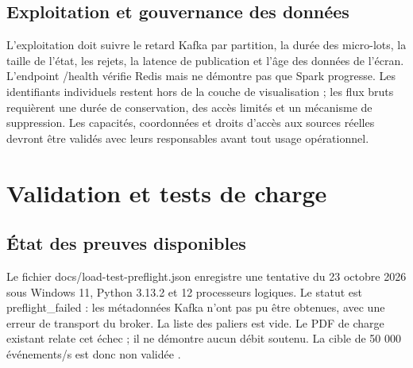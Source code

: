 \documentclass[a4paper,11pt]{article}
\begin{document}
\subsection{Exploitation et gouvernance des données}
L'exploitation doit suivre le retard Kafka par partition, la durée des micro-lots, la taille de l'état, les rejets, la latence de publication et l'âge des données de l'écran. L'endpoint /health vérifie Redis mais ne démontre pas que Spark progresse. Les identifiants individuels restent hors de la couche de visualisation ; les flux bruts requièrent une durée de conservation, des accès limités et un mécanisme de suppression. Les capacités, coordonnées et droits d'accès aux sources réelles devront être validés avec leurs responsables avant tout usage opérationnel.
\par

\clearpage
\section{Validation et tests de charge}\label{sec:8}
\subsection{État des preuves disponibles}
Le fichier {\small\ttfamily docs/\allowbreak{}load-test-preflight.\allowbreak{}json} enregistre une tentative du 23 octobre 2026 sous Windows 11, Python 3.13.2 et 12 processeurs logiques. Le statut est {\small\ttfamily preflight\_\allowbreak{}failed} : les métadonnées Kafka n'ont pas pu être obtenues, avec une erreur de transport du broker. La liste des paliers est vide. Le PDF de charge existant relate cet échec ; il ne démontre aucun débit soutenu. La cible de 50 000 événements/s est donc non validée \cite{ref9}.
\par
\end{document}
